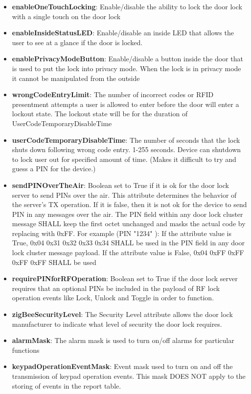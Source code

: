 \begin{itemize}
\item \textbf{enableOneTouchLocking}: Enable/disable the ability to lock the door lock with a single touch on the door lock
\item \textbf{enableInsideStatusLED}: Enable/disable an inside LED that allows the user to see at a glance if the door is locked.
\item \textbf{enablePrivacyModeButton}: Enable/disable a button inside the door that is used to put the lock into privacy mode. When the lock is in privacy mode it cannot be manipulated from the outside
\item \textbf{wrongCodeEntryLimit}: The number of incorrect codes or RFID presentment attempts a user is allowed to enter before the door will enter a lockout state. The lockout state will be for the duration of UserCodeTemporaryDisableTime
\item \textbf{userCodeTemporaryDisableTime}: The number of seconds that the lock shuts down following wrong code entry. 1-255 seconds. Device can shutdown to lock user out for specified amount of time. (Makes it difficult to try and guess a PIN for the device.)
\item \textbf{sendPINOverTheAir}: Boolean set to True if it is ok for the door lock server to send PINs over the air. This attribute determines the behavior of the server’s TX operation. If it is false, then it is not ok for the device to send PIN in any messages over the air. The PIN field within any door lock cluster message SHALL keep the first octet unchanged and masks the actual code by replacing with 0xFF. For example (PIN "1234" ): If the attribute value is True, 0x04 0x31 0x32 0x33 0x34 SHALL be used in the PIN field in any door lock cluster message payload. If the attribute value is False, 0x04 0xFF 0xFF 0xFF 0xFF SHALL be used
\item \textbf{requirePINforRFOperation}: Boolean set to True if the door lock server requires that an optional PINs be included in the payload of RF lock operation events like Lock, Unlock and Toggle in order to function.
\item \textbf{zigBeeSecurityLevel}: The Security Level attribute allows the door lock manufacturer to indicate what level of security the door lock requires.
\item \textbf{alarmMask}: The alarm mask is used to turn on/off alarms for particular functions
\item \textbf{keypadOperationEventMask}: Event mask used to turn on and off the transmission of keypad operation events. This mask DOES NOT apply to the storing of events in the report table.

\end{itemize}

